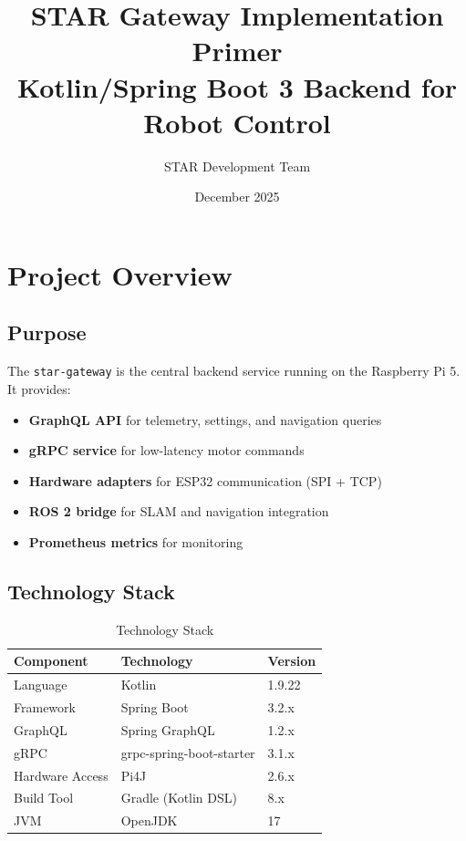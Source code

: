 \documentclass[11pt,letterpaper]{article}
\title{\textbf{STAR Gateway Implementation Primer}\\[0.5cm]
\large Kotlin/Spring Boot 3 Backend for Robot Control}
\author{STAR Development Team}
\date{December 2025}
\begin{document}
\maketitle
\tableofcontents
\newpage

\section{Project Overview}

\subsection{Purpose}

The \texttt{star-gateway} is the central backend service running on the Raspberry Pi 5. It provides:

\begin{itemize}
    \item \textbf{GraphQL API} for telemetry, settings, and navigation queries
    \item \textbf{gRPC service} for low-latency motor commands
    \item \textbf{Hardware adapters} for ESP32 communication (SPI + TCP)
    \item \textbf{ROS 2 bridge} for SLAM and navigation integration
    \item \textbf{Prometheus metrics} for monitoring
\end{itemize}

\subsection{Technology Stack}

\begin{table}[H]
\centering
\begin{tabular}{|l|l|l|}
\hline
\textbf{Component} & \textbf{Technology} & \textbf{Version} \\
\hline
Language & Kotlin & 1.9.22 \\
Framework & Spring Boot & 3.2.x \\
GraphQL & Spring GraphQL & 1.2.x \\
gRPC & grpc-spring-boot-starter & 3.1.x \\
Hardware Access & Pi4J & 2.6.x \\
Build Tool & Gradle (Kotlin DSL) & 8.x \\
JVM & OpenJDK & 17 \\
\hline
\end{tabular}
\caption{Technology Stack}
\end{table}
\end{document}
